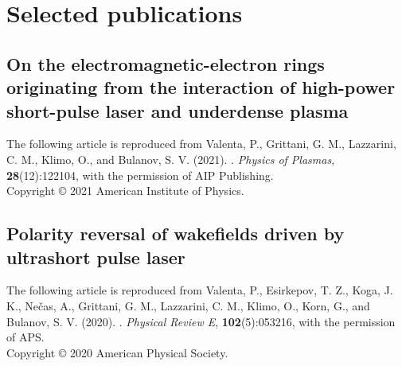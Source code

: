 \documentclass[10pt, a4paper, twoside, openright]{report}
\newcommand{\link}[3][blue]{\href{#2}{\color{#1}{#3}}}%
\begin{document}
\chapter{Selected publications\label{chap:selected_publications}}
%

\newpage
\thispagestyle{empty}
\mbox{}

\newpage
\section{On the electromagnetic-electron rings originating from the interaction of high-power short-pulse laser and underdense plasma \label{sec:paper_1}}

The following article is reproduced from Valenta, P., Grittani, G. M., Lazzarini, C. M., Klimo, O., and Bulanov, S. V. (2021). \link{http://dx.doi.org/10.1063/5.0065167}{On the electromagnetic-electron rings originating from the interaction of high-power short-pulse laser and underdense plasma}. \textit{Physics of Plasmas}, \textbf{28}(12):122104, with the permission of AIP Publishing. \\

\noindent Copyright {\copyright} {2021} {American Institute of Physics}.

\newpage
\thispagestyle{empty}
\mbox{}




\newpage
\section{Polarity reversal of wakefields driven by ultrashort pulse laser \label{sec:paper_2}}

The following article is reproduced from Valenta, P., Esirkepov, T. Z., Koga, J. K., Nečas, A., Grittani, G. M., Lazzarini, C. M., Klimo, O., Korn, G., and Bulanov, S. V. (2020). \link{http://dx.doi.org/10.1103/PhysRevE.102.053216}{Polarity reversal of wakefields driven by ultrashort pulse laser}. \textit{Physical Review E}, \textbf{102}(5):053216, with the permission of APS. \\

\noindent Copyright {\copyright} {2020} {American Physical Society}.

\newpage
\mbox{}
\thispagestyle{empty}

\newpage

\end{document}
